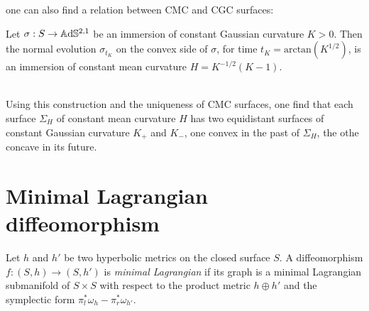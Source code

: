 one can also find a relation between CMC and CGC surfaces:
\begin{proposition}
    Let $\sigma: S \to\mathbb{A}\mathrm{d}\mathbb{S}^{2,1}$ be an immersion of constant Gaussian curvature $K>0$. Then the normal evolution $\sigma_{t_K}$ on the convex side of $\sigma$, for time $t_K=\text{arctan}(K^{1/2})$, is an immersion of constant mean curvature $H=K^{-1/2}(K-1)$.
\end{proposition}
\\
Using this construction and the uniqueness of CMC surfaces, one find that each surface $\Sigma_H$ of constant mean curvature $H$ has two equidistant surfaces of constant Gaussian curvature $K_+$ and $K_-$, one convex in the past of $\Sigma_H$, the othe concave in its future.

\section{Minimal Lagrangian diffeomorphism}

\begin{definition}
    Let $h$ and $h'$ be two hyperbolic metrics on the closed surface $S$. A diffeomorphism $f: (S,h) \to (S,h')$ is \textit{minimal Lagrangian} if its graph is a minimal Lagrangian submanifold of $S\times S$ with respect to the product metric $h \oplus h'$ and the symplectic form $\pi_l^*\omega_h - \pi_r^* \omega_{h'}$. 
\end{definition}

